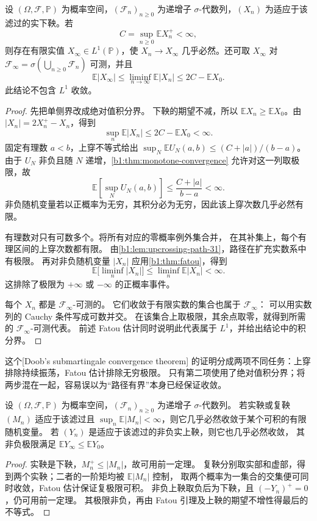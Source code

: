 \begin{theorem}
\label{b1:thm:submartingale-convergence-31}
设 \((\Omega,\mathcal F,\mathbb P)\) 为概率空间，\((\mathcal F_n)_{n\geq0}\)
为递增子 \(\sigma\)-代数列，\((X_n)\) 为适应于该滤过的实下鞅。若
\[
 C=\sup_{n\geq0}\mathbb E X_n^+<\infty,
\]
则存在有限实值 \(X_\infty\in L^1(\mathbb P)\)，使
\(X_n\to X_\infty\) 几乎必然。还可取 \(X_\infty\) 对
\(\mathcal F_\infty=\sigma(\bigcup_{n\geq0}\mathcal F_n)\) 可测，并且
\[
 \mathbb E|X_\infty|
 \leq\liminf_{n\to\infty}\mathbb E|X_n|
 \leq 2C-\mathbb E X_0.
\]
此结论不包含 \(L^1\) 收敛。
\end{theorem}
\begin{proof}
先把单侧界改成绝对值积分界。
下鞅的期望不减，所以 \(\mathbb E X_n\geq\mathbb E X_0\)。由
\(|X_n|=2X_n^+-X_n\)，得到
\[
 \sup_n\mathbb E|X_n|\leq 2C-\mathbb E X_0<\infty.
\]
固定有理数 \(a<b\)，上穿不等式给出
\(\sup_N\mathbb E U_N(a,b)\leq(C+|a|)/(b-a)\)。
由于 \(U_N\) 非负且随 \(N\) 递增，\cref{b1:thm:monotone-convergence}
允许对这一列取极限，故
\[
 \mathbb E\left[\sup_N U_N(a,b)\right]
 \leq\frac{C+|a|}{b-a}<\infty.
\]
非负随机变量若以正概率为无穷，其积分必为无穷，因此该上穿次数几乎必然有限。

有理数对只有可数多个。将所有对应的零概率例外集合并，
在其补集上，每个有理区间的上穿次数都有限。
由\cref{b1:lem:upcrossing-path-31}，路径在扩充实数系中有极限。
再对非负随机变量 \(|X_n|\) 应用\cref{b1:thm:fatou}，得到
\[
 \mathbb E\bigl[\liminf_n|X_n|\bigr]
 \leq\liminf_n\mathbb E|X_n|<\infty.
\]
这排除了极限为 \(+\infty\) 或 \(-\infty\) 的正概率事件。

每个 \(X_n\) 都是 \(\mathcal F_\infty\)-可测的。
它们收敛于有限实数的集合也属于 \(\mathcal F_\infty\)：
可以用实数列的 Cauchy 条件写成可数并交。
在该集合上取极限，其余点取零，就得到所需的 \(\mathcal F_\infty\)-可测代表。
前述 Fatou 估计同时说明此代表属于 \(L^1\)，并给出结论中的积分界。
\end{proof}

这个[Doob's submartingale convergence theorem]
的证明分成两项不同任务：上穿排除持续振荡，Fatou 估计排除无穷极限。
只有第二项使用了绝对值积分界；将两步混在一起，容易误以为“路径有界”本身已经保证收敛。

\begin{corollary}[鞅与非负上鞅的收敛]
\label{b1:cor:martingale-as-convergence-31}
设 \((\Omega,\mathcal F,\mathbb P)\) 为概率空间，\((\mathcal F_n)_{n\geq0}\)
为递增子 \(\sigma\)-代数列。
若实鞅或复鞅 \((M_n)\) 适应于该滤过且
\(\sup_n\mathbb E|M_n|<\infty\)，则它几乎必然收敛于某个可积的有限随机变量。
若 \((Y_n)\) 是适应于该滤过的非负实上鞅，则它也几乎必然收敛，
其非负极限满足 \(\mathbb E Y_\infty\leq\mathbb E Y_0\)。
\end{corollary}
\begin{proof}
实鞅是下鞅，\(M_n^+\leq|M_n|\)，故可用前一定理。
复鞅分别取实部和虚部，得到两个实鞅；二者的一阶矩均被 \(\mathbb E|M_n|\) 控制，
取两个概率为一集合的交集便可同时收敛，Fatou 估计保证复极限可积。
非负上鞅取负后为下鞅，且 \((-Y_n)^+=0\)，仍可用前一定理。
其极限非负，再由 Fatou 引理及上鞅的期望不增性得最后的不等式。
\end{proof}

